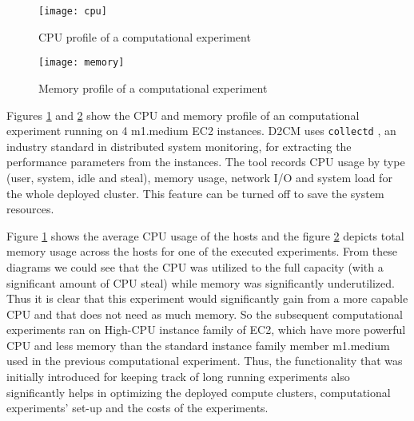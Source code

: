 \documentclass[a4paper,10pt]{article}
\begin{document}
\begin{figure}
\centering
\texttt{[image: cpu]}
\caption{CPU profile of a computational experiment}
\label{fig:CPUProfile}
\end{figure}

\begin{figure}
\centering
\texttt{[image: memory]}
\caption{Memory profile of a computational experiment}
\label{fig:MemProfile}
\end{figure}


Figures \ref{fig:CPUProfile} and \ref{fig:MemProfile} show the CPU and memory profile of an computational experiment running on 4 m1.medium EC2 instances. D2CM uses \texttt{collectd} \cite{collectd}, an industry standard in distributed system monitoring, for extracting the performance parameters from the instances.  The tool records CPU usage by type (user, system, idle and steal), memory usage, network I/O and system load for the whole deployed cluster. This feature can be turned off to save the system resources.

Figure \ref{fig:CPUProfile} shows the average CPU usage of the hosts and the figure \ref{fig:MemProfile} depicts total memory usage across the hosts for one of the executed experiments. From these diagrams we could see that the CPU was utilized to the full capacity (with a significant amount of CPU steal) while memory was significantly underutilized. Thus it is clear that this experiment would significantly gain from a more capable CPU and that does not need as much memory. So the subsequent computational experiments ran on High-CPU instance family of EC2, which have more powerful CPU and less memory than the standard instance family member m1.medium used in the previous computational experiment. Thus, the functionality that was initially introduced for keeping track of long running experiments also significantly helps in optimizing the deployed compute clusters, computational experiments' set-up and the costs of the experiments. 
\end{document}
